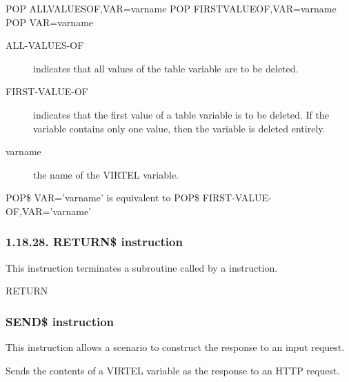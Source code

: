 \documentclass[letterpaper,10pt,english]{sphinxmanual}
\begin{document}
\begin{sphinxVerbatim}[commandchars=\\\{\}]
POP\PYGZdl{} ALL\PYGZhy{}VALUES\PYGZhy{}OF,VAR=\PYGZsq{}varname\PYGZsq{}
POP\PYGZdl{} FIRST\PYGZhy{}VALUE\PYGZhy{}OF,VAR=\PYGZsq{}varname\PYGZsq{}
POP\PYGZdl{} VAR=\PYGZsq{}varname\PYGZsq{}
\end{sphinxVerbatim}
\begin{description}
\item[{ALL-VALUES-OF}] \leavevmode
indicates that all values of the table variable are to be deleted.

\item[{FIRST-VALUE-OF}] \leavevmode
indicates that the first value of a table variable is to be deleted. If the variable contains only one value, then the variable is deleted entirely.

\item[{varname}] \leavevmode
the name of the VIRTEL variable.

\end{description}

POP\$ VAR=’varname’ is equivalent to POP\$ FIRST-VALUE-OF,VAR=’varname’


\subsubsection{1.18.28. RETURN\$ instruction}
\label{\detokenize{User_Guide:return-instruction}}
This instruction terminates a subroutine called by a {\hyperref[\detokenize{User_Guide:v457ug-map-execute}]{}} instruction.

\begin{sphinxVerbatim}[commandchars=\\\{\}]
RETURN\PYGZdl{}
\end{sphinxVerbatim}


\subsubsection{SEND\$ instruction}
\label{\detokenize{User_Guide:send-instruction}}
This instruction allows a scenario to construct the response to an input request.


Sends the contents of a VIRTEL variable as the response to an HTTP request.
\end{document}
